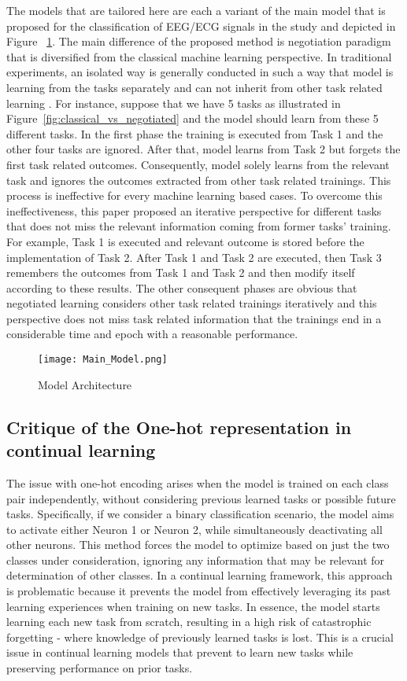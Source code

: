 \documentclass{article}
\begin{document}
The models that are tailored here are each a variant of the main model that is proposed for the classification of EEG/ECG signals in the study \cite{olmez2021strengthening} and depicted in Figure ~\ref{fig:Main_Model}. The main difference of the proposed method is negotiation paradigm that is diversified from the classical machine learning perspective. In traditional experiments, an isolated way is generally conducted in such a way that model is learning from the tasks separately and can not inherit from other task related learning . For instance, suppose that we have 5 tasks as illustrated in Figure~\ref{fig:classical_vs_negotiated} and the model should learn from these 5 different tasks. In the first phase the training is executed from Task 1 and the other four tasks are ignored. After that, model learns from Task 2 but forgets the first task related outcomes. Consequently, model solely learns from the relevant task and ignores the outcomes extracted from other task related trainings.  This process is ineffective for every machine learning based cases. To overcome this ineffectiveness, this paper proposed an iterative perspective for different tasks that does not miss the relevant information coming from former tasks' training. For example, Task 1 is executed and relevant outcome is stored before the implementation of Task 2. After Task 1 and Task 2 are executed, then Task 3 remembers the outcomes from Task 1 and Task 2 and then modify itself according to these results. The other consequent phases are obvious that negotiated learning considers other task related trainings iteratively and this perspective does not miss task related information that the trainings end in a considerable time and epoch with a reasonable performance. 


\begin{figure}[ht]
\centering
\texttt{[image: Main\_Model.png]}
\caption{Model Architecture}
\label{fig:Main_Model}
\end{figure}

\subsection{Critique of the One-hot representation in continual learning}

The issue with one-hot encoding arises when the model is trained on each class pair independently, without considering previous learned tasks or possible future tasks. Specifically, if we consider a binary classification scenario, the model aims to activate either Neuron 1 or Neuron 2, while simultaneously deactivating all other neurons. This method forces the model to optimize based on just the two classes under consideration, ignoring any information that may be relevant for determination of other classes.
In a continual learning framework, this approach is problematic because it prevents the model from effectively leveraging its past learning experiences when training on new tasks. In essence, the model starts learning each new task from scratch, resulting in a high risk of catastrophic forgetting - where knowledge of previously learned tasks is lost. This is a crucial issue in continual learning models that prevent to learn new tasks while preserving performance on prior tasks.
\end{document}
